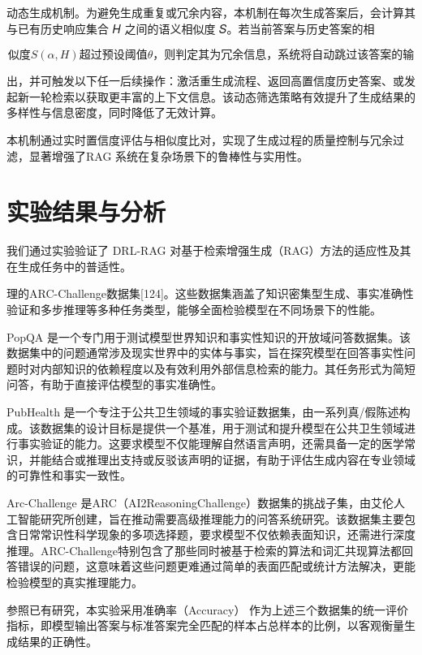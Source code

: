 \documentclass[12pt,a4paper,openright,UTF8]{ctexbook}
\begin{document}
动态生成机制。为避免生成重复或冗余内容，本机制在每次生成答案后，会计算其与已有历史响应集合 𝐻 之间的语义相似度 𝑆。若当前答案与历史答案的相

\begin{equation}
似度S(\alpha,H)超过预设阈值\theta，则判定其为冗余信息，系统将自动跳过该答案的输
\end{equation}

出，并可触发以下任一后续操作：激活重生成流程、返回高置信度历史答案、或发起新一轮检索以获取更丰富的上下文信息。该动态筛选策略有效提升了生成结果的多样性与信息密度，同时降低了无效计算。


本机制通过实时置信度评估与相似度比对，实现了生成过程的质量控制与冗余过滤，显著增强了RAG 系统在复杂场景下的鲁棒性与实用性。

\section{实验结果与分析}

我们通过实验验证了 DRL-RAG 对基于检索增强生成（RAG）方法的适应性及其在生成任务中的普适性。


理的ARC-Challenge数据集[124]。这些数据集涵盖了知识密集型生成、事实准确性验证和多步推理等多种任务类型，能够全面检验模型在不同场景下的性能。


PopQA 是一个专门用于测试模型世界知识和事实性知识的开放域问答数据集。该数据集中的问题通常涉及现实世界中的实体与事实，旨在探究模型在回答事实性问题时对内部知识的依赖程度以及有效利用外部信息检索的能力。其任务形式为简短问答，有助于直接评估模型的事实准确性。


PubHealth 是一个专注于公共卫生领域的事实验证数据集，由一系列真/假陈述构成。该数据集的设计目标是提供一个基准，用于测试和提升模型在公共卫生领域进行事实验证的能力。这要求模型不仅能理解自然语言声明，还需具备一定的医学常识，并能结合或推理出支持或反驳该声明的证据，有助于评估生成内容在专业领域的可靠性和事实一致性。


Arc-Challenge 是ARC（AI2ReasoningChallenge）数据集的挑战子集，由艾伦人工智能研究所创建，旨在推动需要高级推理能力的问答系统研究。该数据集主要包含日常常识性科学现象的多项选择题，要求模型不仅依赖表面知识，还需进行深度推理。ARC-Challenge特别包含了那些同时被基于检索的算法和词汇共现算法都回答错误的问题，这意味着这些问题更难通过简单的表面匹配或统计方法解决，更能检验模型的真实推理能力。


参照已有研究，本实验采用准确率（Accuracy） 作为上述三个数据集的统一评价指标，即模型输出答案与标准答案完全匹配的样本占总样本的比例，以客观衡量生成结果的正确性。
\end{document}

